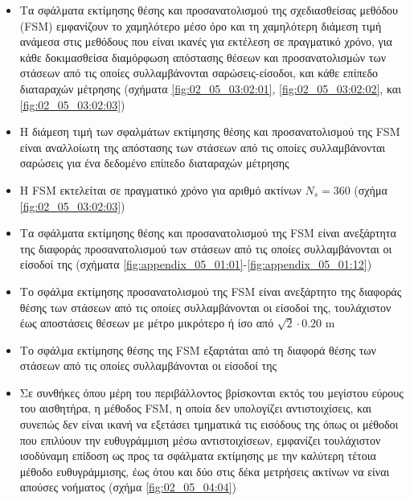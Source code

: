 \begin{itemize}
  \item Τα σφάλματα εκτίμησης θέσης και προσανατολισμού της σχεδιασθείσας
        μεθόδου (FSM) εμφανίζουν το χαμηλότερο μέσο όρο και τη χαμηλότερη
        διάμεση τιμή ανάμεσα στις μεθόδους που είναι ικανές για εκτέλεση σε
        πραγματικό χρόνο, για κάθε δοκιμασθείσα διαμόρφωση απόστασης θέσεων και
        προσανατολισμών των στάσεων από τις οποίες συλλαμβάνονται
        σαρώσεις-είσοδοι, και κάθε επίπεδο διαταραχών μέτρησης (σχήματα
        \ref{fig:02_05_03:02:01}, \ref{fig:02_05_03:02:02}, και
        \ref{fig:02_05_03:02:03})
  \item Η διάμεση τιμή των σφαλμάτων εκτίμησης θέσης και προσανατολισμού
        της FSM είναι αναλλοίωτη της απόστασης των στάσεων από τις οποίες
        συλλαμβάνονται σαρώσεις για ένα δεδομένο επίπεδο διαταραχών μέτρησης
  \item Η FSM εκτελείται σε πραγματικό χρόνο για αριθμό ακτίνων $N_s = 360$
        (σχήμα \ref{fig:02_05_03:02:03})
  \item Τα σφάλματα εκτίμησης θέσης και προσανατολισμού της FSM είναι
        ανεξάρτητα της διαφοράς προσανατολισμού των στάσεων από τις οποίες
        συλλαμβάνονται οι είσοδοί της (σχήματα
        \ref{fig:appendix_05_01:01}-\ref{fig:appendix_05_01:12})
  \item Το σφάλμα εκτίμησης προσανατολισμού της FSM είναι ανεξάρτητο της
        διαφοράς θέσης των στάσεων από τις οποίες συλλαμβάνονται οι είσοδοί της,
        τουλάχιστον έως αποστάσεις θέσεων με μέτρο μικρότερο ή ίσο από
        $\sqrt{2}\cdot 0.20$ m
  \item Το σφάλμα εκτίμησης θέσης της FSM εξαρτάται από τη διαφορά θέσης των
        στάσεων από τις οποίες συλλαμβάνονται οι είσοδοί της
  \item Σε συνθήκες όπου μέρη του περιβάλλοντος βρίσκονται εκτός του μεγίστου
        εύρους του αισθητήρα, η μέθοδος FSM, η οποία δεν υπολογίζει
        αντιστοιχίσεις, και συνεπώς δεν είναι ικανή να εξετάσει τμηματικά τις
        εισόδους της όπως οι μέθοδοι που επιλύουν την ευθυγράμμιση μέσω
        αντιστοιχίσεων, εμφανίζει τουλάχιστον ισοδύναμη επίδοση ως προς τα
        σφάλματα εκτίμησης με την καλύτερη τέτοια μέθοδο ευθυγράμμισης, έως
        ότου και δύο στις δέκα μετρήσεις ακτίνων να είναι απούσες νοήματος
        (σχήμα \ref{fig:02_05_04:04})
\end{itemize}
